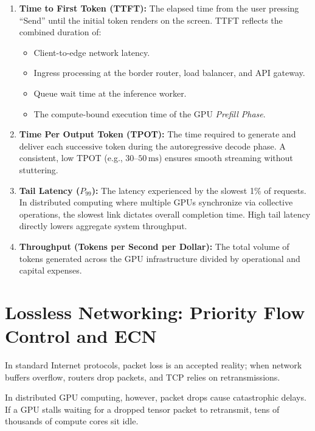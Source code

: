 \documentclass[12pt,a4paper]{report}
\begin{document}
\begin{enumerate}[leftmargin=1.2cm]
    \item \textbf{Time to First Token (TTFT):} The elapsed time from the user pressing ``Send'' until the initial token renders on the screen. TTFT reflects the combined duration of:
    \begin{itemize}
        \item Client-to-edge network latency.
        \item Ingress processing at the border router, load balancer, and API gateway.
        \item Queue wait time at the inference worker.
        \item The compute-bound execution time of the GPU \textit{Prefill Phase}.
    \end{itemize}
    \item \textbf{Time Per Output Token (TPOT):} The time required to generate and deliver each successive token during the autoregressive decode phase. A consistent, low TPOT (e.g., $30$--$50\,\text{ms}$) ensures smooth streaming without stuttering.
    \item \textbf{Tail Latency ($P_{99}$):} The latency experienced by the slowest 1\% of requests. In distributed computing where multiple GPUs synchronize via collective operations, the slowest link dictates overall completion time. High tail latency directly lowers aggregate system throughput.
    \item \textbf{Throughput (Tokens per Second per Dollar):} The total volume of tokens generated across the GPU infrastructure divided by operational and capital expenses.
\end{enumerate}

\section{Lossless Networking: Priority Flow Control and ECN}
In standard Internet protocols, packet loss is an accepted reality; when network buffers overflow, routers drop packets, and TCP relies on retransmissions. 

In distributed GPU computing, however, packet drops cause catastrophic delays. If a GPU stalls waiting for a dropped tensor packet to retransmit, tens of thousands of compute cores sit idle. 
\end{document}
